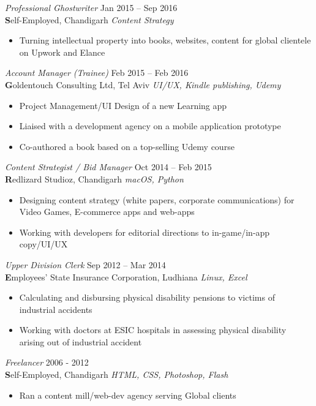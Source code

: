 \documentclass[margin, 10pt]{res} %
\begin{document}
\begin{resume}
\begin{itemize}
\end{itemize}

{\sl Professional Ghostwriter} \hfill Jan 2015 – Sep 2016 \\
\textbf Self-Employed, Chandigarh \hfill {\scriptsize \it Content Strategy}
\begin{itemize}
\item Turning intellectual property into books, websites, content for global clientele on Upwork and Elance
\end{itemize}

{\sl Account Manager (Trainee)} \hfill Feb 2015 – Feb 2016 \\
\textbf Goldentouch Consulting Ltd, Tel Aviv \hfill {\scriptsize \it UI/UX, Kindle publishing, Udemy} 
\begin{itemize}
\item Project Management/UI Design of a new Learning app
\item Liaised with a development agency on a mobile application prototype
\item Co-authored a book based on a top-selling Udemy course
\end{itemize}

{\sl Content Strategist / Bid Manager} \hfill Oct 2014 – Feb 2015 \\
\textbf Redlizard Studioz, Chandigarh \hfill {\scriptsize \it macOS, Python}
\begin{itemize}
\item Designing content strategy (white papers, corporate communications) for Video Games, E-commerce apps and web-apps
\item Working with developers for editorial directions to in-game/in-app copy/UI/UX
\end{itemize}

{\sl Upper Division Clerk} \hfill Sep 2012 – Mar 2014 \\
\textbf Employees' State Insurance Corporation, Ludhiana \hfill {\scriptsize \it Linux, Excel}
\begin{itemize}
\item Calculating and disbursing physical disability pensions to victims of industrial accidents
\item Working with doctors at ESIC hospitals in assessing physical disability arising out of industrial accident 
\end{itemize} 

{\sl Freelancer} \hfill 2006 - 2012 \\
\textbf Self-Employed, Chandigarh \hfill {\scriptsize \it HTML, CSS, Photoshop, Flash} 
\begin{itemize}
\item Ran a content mill/web-dev agency serving Global clients
\end{itemize}


\end{resume}
\end{document}
